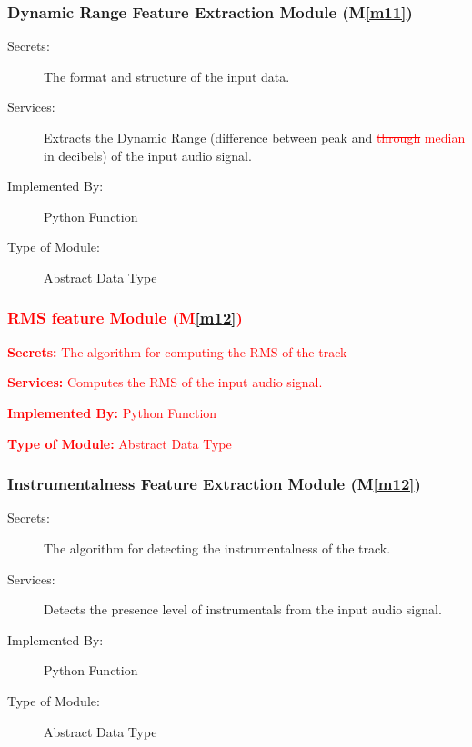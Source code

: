 \documentclass[12pt, titlepage]{article}
\newcommand{\mref}[1]{M\ref{#1}}
\begin{document}
\subsubsection{Dynamic Range Feature Extraction Module (\mref{m11})}

\begin{description}
\item[Secrets:]The format and structure of the input data.
\item[Services:]Extracts the Dynamic Range (difference between peak and \textcolor{red}{\sout{through} median} in decibels) of the input audio signal.
\item[Implemented By:] Python Function
\item[Type of Module:] Abstract Data Type
\end{description}

\subsubsection{\textcolor{red}{RMS feature Module (\mref{m12})}}

\begin{description}
\item \textcolor{red}{\textbf{Secrets:} The algorithm for computing the RMS of the track}
\item \textcolor{red}{\textbf{Services:} Computes the RMS of the input audio signal.}
\item \textcolor{red}{\textbf{Implemented By:} Python Function}
\item \textcolor{red}{\textbf{Type of Module:} Abstract Data Type}
\end{description}

\subsubsection{Instrumentalness Feature Extraction Module (\mref{m12})}

\begin{description}
\item[Secrets:] The algorithm for detecting the instrumentalness of the track. 
\item[Services:] Detects the presence level of instrumentals from the input audio signal. 
\item[Implemented By:] Python Function
\item[Type of Module:] Abstract Data Type
\end{description}
\end{document}
